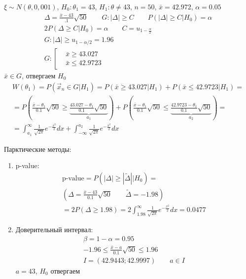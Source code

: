 \documentclass{article}
\begin{document}
\begin{eg}
  $\xi \sim N(\theta, 0,001)$, $H_0: \theta_1 = 43$, $H_1: \theta \neq 43$, $n=50$, $\bar{x}=42.972$, $\alpha=0.05$
  \begin{gather*}
    \Delta=\frac{\bar{x}-43}{.1}\sqrt{50} \qquad G: |\Delta| \ge C \qquad P(|\Delta| \ge C| H_0)=\alpha \\ 
    2P(\Delta \ge C | H_0) =\alpha \qquad C=u_{1-\frac{\alpha}{2}} \\ 
    G: |\Delta| \ge u_{1-\alpha/2}=1.96 \\ 
    G: \left[\begin{aligned}
      & \bar{x} \ge 43.027 \\
      & \bar{x} \le 42.9723
    \end{aligned}\right.
  \end{gather*}
  $\bar{x}\in G$, отвергаем $H_0$
  \begin{gather*}
    W(\theta_1)=P(\vec{x}_n \in G | H_1)=P(\bar{x}\ge 43.027 | H_1) + P(\bar{x} \le 42.9723 | H_1) = \\ 
    = P(\frac{\bar{x}-\theta_1}{0.1}\sqrt{50} \ge \underbrace{\frac{43.027 - \theta_1}{0.1}\sqrt{50}}_{a_1}) +
P(\frac{\bar{x}-\theta_1}{0.1}\sqrt{50} \le \underbrace{\frac{42.9723 - \theta_1}{0.1}\sqrt{50}}_{a_2})= \\ 
= \int_{a_1}^{\infty}\frac{1}{\sqrt{2\pi}}e^{-\frac{x^{2}}{2}}dx + \int_{-\infty}^{a_2}\frac{1}{\sqrt{2\pi}}e^{-\frac{x^{2}}{2}}dx
  \end{gather*}
  

  Парктические методы:
  \begin{enumerate}
    \item p-value:
  \begin{gather*}
    \text{p-value}=P(|\Delta| \ge |\tilde{\Delta}| | H_0)= \\ 
    (\Delta=\frac{\bar{x}-43}{0.1}\sqrt{50} \qquad \tilde{\Delta}=-1.98) \\ 
    =2P(\Delta \ge 1.98) = 2 \int_{ 1.98}^{\infty}\frac{1}{\sqrt{2\pi}}e^{-\frac{x^{2}}{2}}dx = 0.0477
  \end{gather*}
    \item Доверительный интервал: 
      \begin{gather*}
        \beta=1-\alpha=0.95 \\ 
        -1.96 \le \frac{\bar{x}-a}{0.1}\sqrt{50} \le 1.96  \\ 
        I=(42.9443;42.9997) \qquad a \in I
      \end{gather*}
      $a=43$, $H_0$ отвергаем
  \end{enumerate}
\end{eg}
\end{document}
